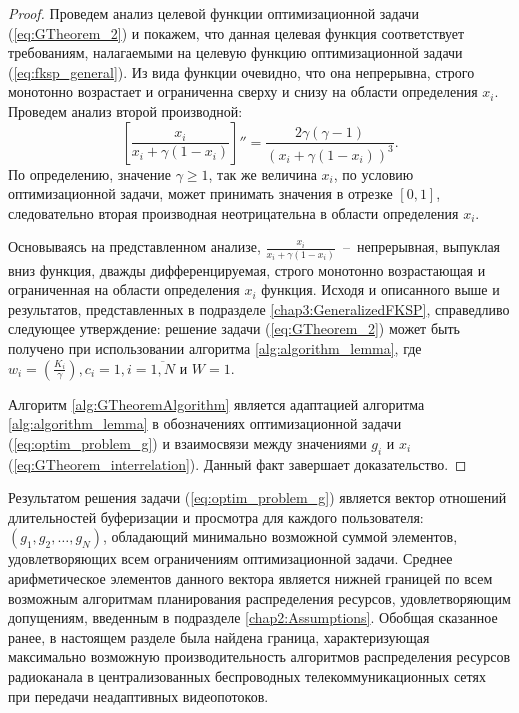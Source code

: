 \begin{proof}
Проведем анализ целевой функции оптимизационной задачи (\ref{eq:GTheorem_2}) и покажем, что данная целевая функция соответствует требованиям, налагаемыми на целевую функцию оптимизационной задачи (\ref{eq:fksp_general}). Из вида функции очевидно, что она непрерывна, строго монотонно возрастает и ограниченна сверху и снизу на области определения $x_i$. Проведем анализ второй производной:
$$\left[\frac{x_i}{x_i + \gamma (1-x_i)}\right]'' = \frac{2\gamma(\gamma - 1)}{(x_i + \gamma(1 - x_i))^3}.$$
По определению, значение $\gamma \geq 1$, так же величина $x_i$, по условию оптимизационной задачи, может принимать значения в отрезке $[0,1]$, следовательно вторая производная неотрицательна в области определения $x_i$.

Основываясь на представленном анализе, $\frac{x_i}{x_i + \gamma (1-x_i)}$~--~непрерывная, выпуклая вниз функция, дважды дифференцируемая, строго монотонно возрастающая и ограниченная на области определения $x_i$ функция. Исходя и описанного выше и результатов, представленных в подразделе \ref{chap3:GeneralizedFKSP}, справедливо следующее утверждение: решение задачи (\ref{eq:GTheorem_2}) может быть получено при использовании алгоритма \ref{alg:algorithm_lemma}, где $w_i = \left(\frac{K_i}{\gamma}\right), c_i = 1, i=\overline{1,N}$ и $W = 1$.

Алгоритм \ref{alg:GTheoremAlgorithm} является адаптацией алгоритма \ref{alg:algorithm_lemma} в обозначениях оптимизационной задачи (\ref{eq:optim_problem_g}) и взаимосвязи между значениями $g_i$ и $x_i$ (\ref{eq:GTheorem_interrelation}). Данный факт завершает доказательство.
\end{proof}

Результатом решения задачи (\ref{eq:optim_problem_g}) является вектор отношений длительностей буферизации и просмотра для каждого пользователя: $(g_1, g_2, \ldots, g_N)$, обладающий минимально возможной суммой элементов, удовлетворяющих всем ограничениям оптимизационной задачи. Среднее арифметическое элементов данного вектора является нижней границей по всем возможным алгоритмам планирования распределения ресурсов, удовлетворяющим допущениям, введенным в подразделе \ref{chap2:Assumptions}. Обобщая сказанное ранее, в настоящем разделе была найдена граница, характеризующая максимально возможную производительность алгоритмов распределения ресурсов радиоканала в централизованных беспроводных телекоммуникационных сетях при передачи неадаптивных видеопотоков.

